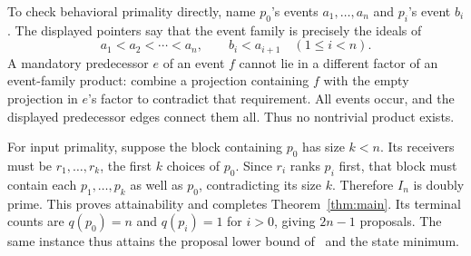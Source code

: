 \documentclass[11pt]{article}
\begin{document}
To check behavioral primality directly, name $p_0$'s events
$a_1,\ldots,a_n$ and $p_i$'s event $b_i$. The displayed pointers say
that the event family is precisely the ideals of
\[
          a_1<a_2<\cdots<a_n,\qquad
          b_i<a_{i+1}\quad(1\le i<n).
\]
A mandatory predecessor $e$ of an event $f$ cannot lie in a different
factor of an event-family product: combine a projection containing $f$
with the empty projection in $e$'s factor to contradict that
requirement. All events occur, and the displayed predecessor edges
connect them all. Thus no nontrivial product exists.

For input primality, suppose the block containing $p_0$ has size $k<n$.
Its receivers must be $r_1,\ldots,r_k$, the first $k$ choices of $p_0$.
Since $r_i$ ranks $p_i$ first, that block must contain each
$p_1,\ldots,p_k$ as well as $p_0$, contradicting its size $k$.
Therefore $I_n$ is doubly prime. This proves attainability and completes
Theorem~\ref{thm:main}. Its terminal counts are $q(p_0)=n$ and
$q(p_i)=1$ for $i>0$, giving $2n-1$ proposals. The same instance thus
attains the proposal lower bound of~\cite[Proposition~21.4]{ishida}
and the state minimum.
\end{document}
